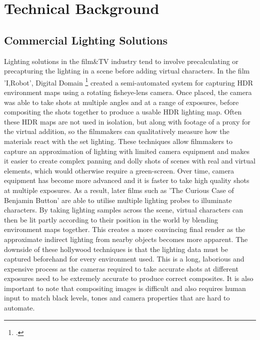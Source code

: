 \documentclass[ %
                    author={Gavin Parker},
                supervisor={Dr. Neill Campbell},
                    degree={MEng},
                     title={Deep Siamese Networks for Illumination Estimation from Stereo Images},
                  subtitle={},
                      type={research},
                      year={2018} ]{dissertation}
\begin{document}

\chapter{Technical Background}
\label{chap:technical}
\section{Commercial Lighting Solutions}
Lighting solutions in the film\&TV industry tend to involve precalculating or precapturing the lighting in a scene before adding virtual characters. In the film 'I,Robot', Digital Domain \footcite{https://www.digitaldomain.com/work/i-robot/}  created a semi-automated system for capturing HDR environment maps using a rotating fisheye-lens camera. Once placed, the camera was able to take shots at multiple angles and at a range of exposures, before compositing the shots together to produce a usable HDR lighting map. Often these HDR maps are not used in isolation, but along with footage of a proxy for the virtual addition, so the filmmakers can qualitatively measure how the materials react with the set lighting. These techniques allow filmmakers to capture an approximation of lighting with limited camera equipment and makes it easier to create complex panning and dolly shots of scenes with real and virtual elements, which would otherwise require a green-screen. Over time, camera equipment has become more advanced and it is faster to take high quality shots at multiple exposures. As a result, later films such as 'The Curious Case of Benjamin Button' are able to utilise multiple lighting probes to illuminate characters. By taking lighting samples across the scene, virtual characters can then be lit partly according to their position in the world by blending environment maps together. This creates a more convincing final render as the approximate indirect lighting from nearby objects becomes more apparent. The downside of these hollywood techniques is that the lighting data must be captured beforehand for every environment used. This is a long, laborious and expensive process as the cameras required to take accurate shots at different exposures need to be extremely accurate to produce correct composites. It is also important to note that compositing images is difficult and also requires human input to match black levels, tones and camera properties that are hard to automate.
\newline
\end{document}

